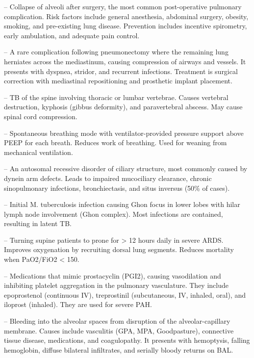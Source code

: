 -- Collapse of alveoli after surgery, the most common post-operative pulmonary complication. Risk factors include general anesthesia, abdominal surgery, obesity, smoking, and pre-existing lung disease. Prevention includes incentive spirometry, early ambulation, and adequate pain control.

-- A rare complication following pneumonectomy where the remaining lung herniates across the mediastinum, causing compression of airways and vessels. It presents with dyspnea, stridor, and recurrent infections. Treatment is surgical correction with mediastinal repositioning and prosthetic implant placement.

-- TB of the spine involving thoracic or lumbar vertebrae. Causes vertebral destruction, kyphosis (gibbus deformity), and paravertebral abscess. May cause spinal cord compression.

-- Spontaneous breathing mode with ventilator-provided pressure support above PEEP for each breath. Reduces work of breathing. Used for weaning from mechanical ventilation.

-- An autosomal recessive disorder of ciliary structure, most commonly caused by dynein arm defects. Leads to impaired mucociliary clearance, chronic sinopulmonary infections, bronchiectasis, and situs inversus (50\% of cases).

-- Initial M. tuberculosis infection causing Ghon focus in lower lobes with hilar lymph node involvement (Ghon complex). Most infections are contained, resulting in latent TB.

-- Turning supine patients to prone for > 12 hours daily in severe ARDS. Improves oxygenation by recruiting dorsal lung segments. Reduces mortality when PaO2/FiO2 < 150.

-- Medications that mimic prostacyclin (PGI2), causing vasodilation and inhibiting platelet aggregation in the pulmonary vasculature. They include epoprostenol (continuous IV), treprostinil (subcutaneous, IV, inhaled, oral), and iloprost (inhaled). They are used for severe PAH.

-- Bleeding into the alveolar spaces from disruption of the alveolar-capillary membrane. Causes include vasculitis (GPA, MPA, Goodpasture), connective tissue disease, medications, and coagulopathy. It presents with hemoptysis, falling hemoglobin, diffuse bilateral infiltrates, and serially bloody returns on BAL.


